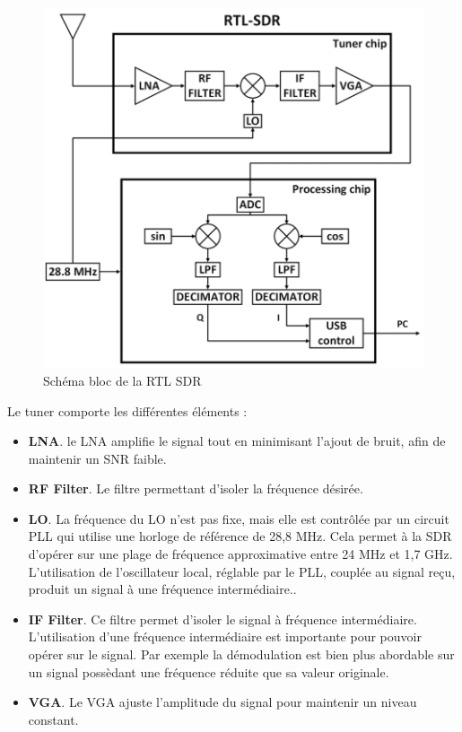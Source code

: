 \newpage

\begin{figure}[h]
\centering

\includegraphics[scale=0.5]{images/SB-rtlsdr.png}
\caption{Schéma bloc de la RTL SDR\cite{SBrtlsdr}}\label{term3000}
\end{figure}


Le tuner comporte les différentes éléments :
\begin{itemize}
\item \textbf{\ac{LNA}}. le \ac{LNA} amplifie le signal tout en minimisant l'ajout de bruit, afin de maintenir un SNR faible.
\item \textbf{\ac{RF} Filter}. Le filtre permettant d'isoler la fréquence désirée.
\item \textbf{\ac{LO}}. La fréquence du \ac{LO} n'est pas fixe, mais elle est contrôlée par un circuit \ac{PLL} qui utilise une horloge de référence de 28,8 MHz. Cela permet à la \ac{SDR} d'opérer sur une plage de fréquence approximative entre 24 MHz et 1,7 GHz. L'utilisation de l'oscillateur local, réglable par le \ac{PLL}, couplée au signal reçu, produit un signal à une fréquence intermédiaire..
\item \textbf{\ac{IF} Filter}. Ce filtre permet d'isoler le signal à fréquence intermédiaire. L'utilisation d'une fréquence intermédiaire est importante pour pouvoir opérer sur le signal. Par exemple la démodulation est bien plus abordable sur un signal possèdant une fréquence réduite que sa valeur originale.
\item \textbf{\ac{VGA}}. Le \ac{VGA} ajuste l'amplitude du signal pour maintenir un niveau constant.
\end{itemize}

